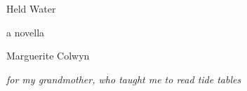 \documentclass[a4paper]{article}
\begin{document}
\vspace*{0.35\textheight}

\begin{center}
{\Large Held Water}

\vspace{1.2cm}

{\normalsize a novella}

\vspace{1.2cm}

{\normalsize Marguerite Colwyn}
\end{center}

\newpage
\thispagestyle{empty}
\vspace*{0.4\textheight}

\begin{center}
{\itshape for my grandmother, who taught me to read tide tables}
\end{center}
\end{document}

